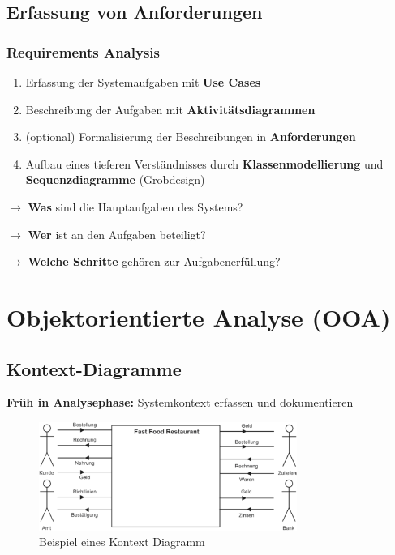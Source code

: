 \documentclass[11pt, a4paper]{article}
\begin{document}
\subsection{Erfassung von Anforderungen}

\subsubsection{Requirements Analysis}

\begin{enumerate}
    \item Erfassung der Systemaufgaben mit \textbf{Use Cases}
    \item Beschreibung der Aufgaben mit \textbf{Aktivitätsdiagrammen}
    \item (optional) Formalisierung der Beschreibungen in \textbf{Anforderungen}
    \item Aufbau eines tieferen Verständnisses durch \textbf{Klassenmodellierung} und \textbf{Sequenzdiagramme} (Grobdesign)
\end{enumerate}

\vspace{1em}

$ \rightarrow $ \textbf{Was} sind die Hauptaufgaben des Systems?

$ \rightarrow $ \textbf{Wer} ist an den Aufgaben beteiligt?

$ \rightarrow $ \textbf{Welche Schritte} gehören zur Aufgabenerfüllung?

\newpage



\newpage


\section{Objektorientierte Analyse (OOA)} %


\subsection{Kontext-Diagramme}

\textbf{Früh in Analysephase:} Systemkontext erfassen und dokumentieren

\begin{figure}[h]
    \centering
    \includegraphics[width=0.75\textwidth]{KontextDiagramm-00.png}
    \caption{Beispiel eines Kontext Diagramm}
    \label{fig:KontextDiagramm-00}
\end{figure}
\end{document}
